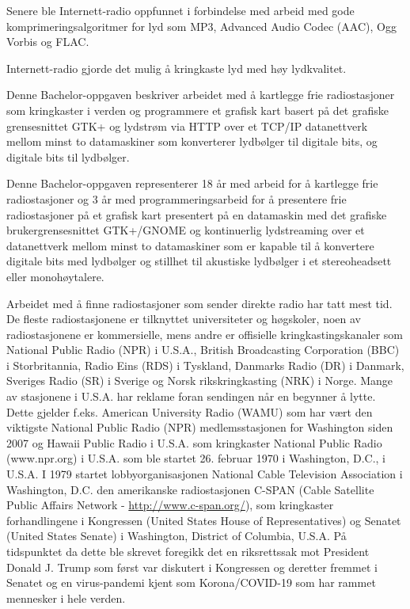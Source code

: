 \documentclass[a4paper,norsk,utf8]{report}
\begin{document}
Senere ble Internett-radio oppfunnet i forbindelse med arbeid med gode
komprimeringsalgoritmer for lyd som MP3, Advanced Audio Codec (AAC), Ogg
Vorbis og FLAC.

Internett-radio gjorde det mulig å kringkaste lyd med høy lydkvalitet.

Denne Bachelor-oppgaven beskriver arbeidet med å kartlegge frie
radiostasjoner som kringkaster i verden og programmere et grafisk kart
basert på det grafiske grensesnittet GTK+ og lydstrøm via HTTP over et
TCP/IP datanettverk mellom minst to datamaskiner som konverterer
lydbølger til digitale bits, og digitale bits til lydbølger.

Denne Bachelor-oppgaven representerer 18 år med arbeid for å kartlegge
frie radiostasjoner og 3 år med programmeringsarbeid for å presentere
frie radiostasjoner på et grafisk kart presentert på en datamaskin med
det grafiske brukergrensesnittet GTK+/GNOME og kontinuerlig
lydstreaming over et datanettverk mellom minst to datamaskiner som er
kapable til å konvertere digitale bits med lydbølger og stillhet til
akustiske lydbølger i et stereoheadsett eller monohøytalere.

Arbeidet med å finne radiostasjoner som sender direkte radio har tatt
mest tid.  De fleste radiostasjonene er tilknyttet universiteter og
høgskoler, noen av radiostasjonene er kommersielle, mens andre er
offisielle kringkastingskanaler som National Public Radio (NPR) i U.S.A.,
British Broadcasting Corporation (BBC) i Storbritannia, Radio Eins (RDS) i Tyskland, Danmarks Radio (DR) i Danmark, Sveriges Radio (SR) i Sverige og Norsk
rikskringkasting (NRK) i Norge.  Mange av stasjonene i U.S.A. har reklame
foran sendingen når en begynner å lytte.  Dette gjelder
f.eks. American University Radio (WAMU) som har vært den viktigste
National Public Radio (NPR) medlemsstasjonen for Washington siden 2007 og
Hawaii Public Radio i U.S.A. som kringkaster National Public Radio
(www.npr.org) i U.S.A. som ble startet 26. februar 1970 i Washington,
D.C., i U.S.A.  I 1979 startet lobbyorganisasjonen National Cable
Television Association i Washington, D.C. den amerikanske
radiostasjonen C-SPAN (Cable Satellite Public Affairs Network -
\url{http://www.c-span.org/}), som kringkaster forhandlingene i
Kongressen (United States House of Representatives) og Senatet (United States Senate) i Washington, District of Columbia, U.S.A.  På tidspunktet da dette ble skrevet foregikk det en riksrettssak mot President Donald J. Trump som først var diskutert i Kongressen og deretter fremmet i Senatet og en virus-pandemi kjent som Korona/COVID-19 som har rammet mennesker i hele verden.
\end{document}
